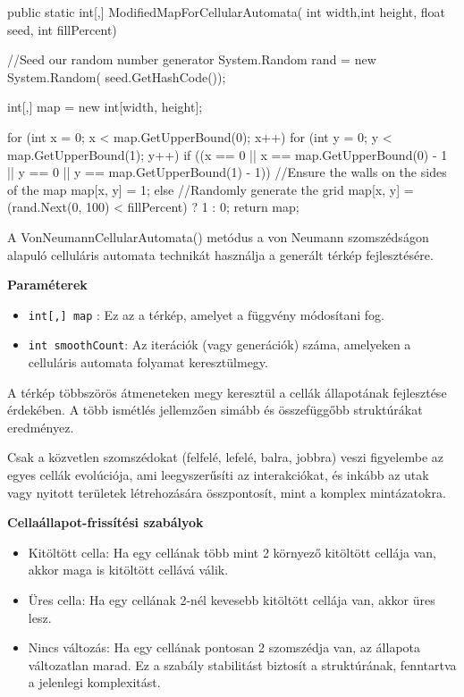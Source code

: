 \begin{java}
 public static int[,] ModifiedMapForCellularAutomata(
    int width,int height, float seed, int fillPercent)
{
    //Seed our random number generator
    System.Random rand = new System.Random(
        seed.GetHashCode());

    int[,] map = new int[width, height];

    for (int x = 0; x < 
        map.GetUpperBound(0); x++)
    {
        for (int y = 0; y < 
            map.GetUpperBound(1); y++)
        {
            if ((x == 0 || x == map.GetUpperBound(0) - 1 || 
                y == 0 || y == map.GetUpperBound(1) - 1))
            {
                //Ensure the walls on the sides of the map
                map[x, y] = 1;
            }
            else
            {
                //Randomly generate the grid
                map[x, y] = (rand.Next(0, 100) < 
                    fillPercent) ? 1 : 0;
            }
        }
    }
    return map;
}
\end{java}

A VonNeumannCellularAutomata() metódus a von Neumann szomszédságon alapuló celluláris automata technikát használja a generált térkép fejlesztésére.

\textbf{Paraméterek}
\begin{itemize}
\item \texttt{int[,] map} : Ez az a térkép, amelyet a függvény módosítani fog.
\item \texttt{int smoothCount}: Az iterációk (vagy generációk) száma, amelyeken a celluláris automata folyamat keresztülmegy.
\end{itemize}

A térkép többszörös átmeneteken megy keresztül a cellák állapotának fejlesztése érdekében. A több ismétlés jellemzően simább és összefüggőbb struktúrákat eredményez.

Csak a közvetlen szomszédokat (felfelé, lefelé, balra, jobbra) veszi figyelembe az egyes cellák evolúciója, ami leegyszerűsíti az interakciókat, és inkább az utak vagy nyitott területek létrehozására összpontosít, mint a komplex mintázatokra.

\textbf{Cellaállapot-frissítési szabályok}
\begin{itemize}
\item Kitöltött cella: Ha egy cellának több mint 2 környező kitöltött cellája van, akkor maga is kitöltött cellává válik.
\item Üres cella: Ha egy cellának 2-nél kevesebb kitöltött cellája van, akkor üres lesz.
\item Nincs változás: Ha egy cellának pontosan 2 szomszédja van, az állapota változatlan marad. Ez a szabály stabilitást biztosít a struktúrának, fenntartva a jelenlegi komplexitást.
\end{itemize}

